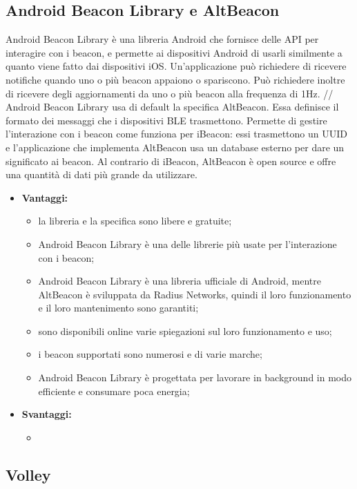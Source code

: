 \subsection{Android Beacon Library e AltBeacon}
	Android Beacon Library è una libreria Android che fornisce delle API per interagire con i beacon, e permette ai dispositivi Android di usarli similmente a quanto viene fatto dai dispositivi iOS. Un'applicazione può richiedere di ricevere notifiche quando uno o più beacon appaiono o spariscono. Può richiedere inoltre di ricevere degli aggiornamenti da uno o più beacon alla frequenza di 1Hz. //
	Android Beacon Library usa di default la specifica AltBeacon. Essa definisce il formato dei messaggi che i dispositivi BLE trasmettono. Permette di gestire l'interazione con i beacon come funziona per iBeacon: essi trasmettono un UUID e l'applicazione che implementa AltBeacon usa un database esterno per dare un significato ai beacon.
	Al contrario di iBeacon, AltBeacon è open source e offre una quantità di dati più grande da utilizzare.
	
	\begin{itemize} %
		\item \textbf{Vantaggi:}
			\begin{itemize}
				\item la libreria e la specifica sono libere e gratuite;
				\item Android Beacon Library è una delle librerie più usate per l'interazione con i beacon;
				\item Android Beacon Library è una libreria ufficiale di Android, mentre AltBeacon è sviluppata da Radius Networks, quindi il loro funzionamento e il loro mantenimento sono garantiti;
				\item sono disponibili online varie spiegazioni sul loro funzionamento e uso;
				\item i beacon supportati sono numerosi e di varie marche;
				\item Android Beacon Library è progettata per lavorare in background in modo efficiente e consumare poca energia;
			\end{itemize}
		\item \textbf{Svantaggi:}
			\begin{itemize}
				\item
			\end{itemize}
	\end{itemize}
		
\subsection{Volley}

